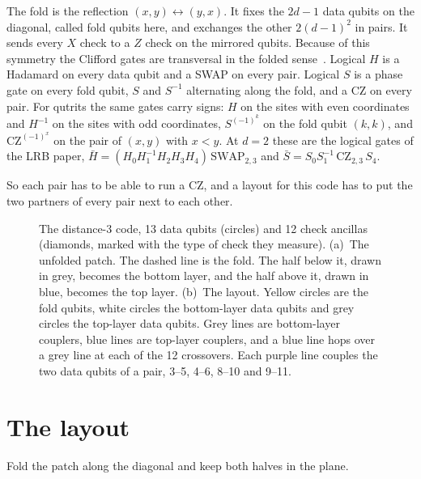 \documentclass[11pt,a4paper]{article}
\begin{document}
The fold is the reflection $(x,y)\leftrightarrow(y,x)$. It fixes the $2d-1$ data qubits on the
diagonal, called fold qubits here, and exchanges the other $2(d-1)^2$ in pairs. It sends every
$X$ check to a $Z$ check on the mirrored qubits. Because of this symmetry the Clifford gates are
transversal in the folded sense~\cite{Moussa2016,Breuckmann2024}. Logical $H$ is a Hadamard on
every data qubit and a SWAP on every pair. Logical $S$ is a phase gate on every fold qubit,
$S$ and $S^{-1}$ alternating along the fold, and a CZ on every pair. For qutrits the same gates
carry signs: $H$ on the sites with even coordinates and $H^{-1}$ on the sites with odd
coordinates, $S^{(-1)^k}$ on the fold qubit $(k,k)$, and $\mathrm{CZ}^{(-1)^x}$ on the pair of
$(x,y)$ with $x<y$. At $d=2$ these are the logical gates of the LRB paper,
$\bar H=(H_0H_1^{-1}H_2H_3H_4)\,\mathrm{SWAP}_{2,3}$ and
$\bar S=S_0S_1^{-1}\,\mathrm{CZ}_{2,3}\,S_4$.

So each pair has to be able to run a CZ, and a layout for this code has to put the two partners
of every pair next to each other.

\begin{figure}[t]
\centering
\begin{subfigure}[b]{0.43\textwidth}
\centering

\caption{}
\end{subfigure}\hfill
\begin{subfigure}[b]{0.55\textwidth}
\centering

\caption{}
\end{subfigure}
\caption{The distance-3 code, 13 data qubits (circles) and 12 check ancillas (diamonds, marked
with the type of check they measure). (a)~The unfolded patch. The dashed line is the fold. The
half below it, drawn in grey, becomes the bottom layer, and the half above it, drawn in blue,
becomes the top layer. (b)~The layout. Yellow circles are the fold qubits, white circles the
bottom-layer data qubits and grey circles the top-layer data qubits. Grey lines are bottom-layer
couplers, blue lines are top-layer couplers, and a blue line hops over a grey line at each of
the 12 crossovers. Each purple line couples the two data qubits of a pair, 3--5, 4--6, 8--10
and 9--11.}
\label{fig:d3}
\end{figure}

\section{The layout}

Fold the patch along the diagonal and keep both halves in the plane.
\end{document}

